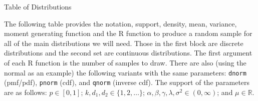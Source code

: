 \documentclass[10pt]{article}
\begin{document}
{\LARGE Table of Distributions}

\vspace*{18pt}

\noindent
The following table provides the notation, support,
density, mean, variance, moment generating function 
and the R function to produce a random sample for all
of the main distributions we will need. Those in the
first block are discrete distributions and the second
set are continuous distributions. The first argument
of each R function is the number of samples to draw.
There are also (using the normal as an example) the
following variants  with the same parameters:
\texttt{dnorm} (pmf/pdf), \texttt{pnorm} (cdf), and
\texttt{qnorm} (inverse cdf). The support of the 
parameters are as follows: $p \in [0, 1]$;
$k, d_1, d_2 \in \{1, 2, \ldots \}$;
$\alpha, \beta, \gamma, \lambda, \sigma^2 \in (0, \infty)$;
and $\mu \in \mathbb{R}$.

\vspace*{18pt}
\end{document}
